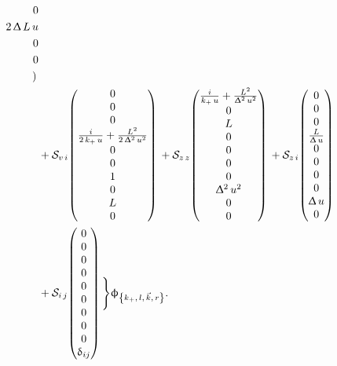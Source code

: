 \begin{equation}
\begin{split}
        0
        \\
        2\, \Delta\, L\, u
        \\
        0
        \\
        0
        \\
      )\,
      \\
      & +
      \cS_{v\, i}
      \mqty(
        0
        \\
        0
        \\
        0
        \\
        \frac{i}{2\, k_+\, u}
        +
        \frac{L^2}{2\, \Delta^2\, u^2}
        \\
        0
        \\
        0
        \\
        1
        \\
        0
        \\
        L
        \\
        0
        \\
      )\,
      +
      \cS_{z\, z}
      \mqty(
        \frac{i}{k_+\, u}
        +
        \frac{L^2}{\Delta^2\, u^2}
        \\
        0
        \\
        L
        \\
        0
        \\
        0
        \\
        0
        \\
        0
        \\
        \Delta^2\, u^2
        \\
        0
        \\
        0
        \\
      )\,
      +
      \cS_{z\, i}
      \mqty(
        0
        \\
        0
        \\
        0
        \\
        \frac{L}{\Delta\, u}
        \\
        0
        \\
        0
        \\
        0
        \\
        0
        \\
        \Delta\, u
        \\
        0
        \\
      )\,
      \\
      & +
      \cS_{i\, j}
      \mqty(
        0
        \\
        0
        \\
        0
        \\
        0
        \\
        0
        \\
        0
        \\
        0
        \\
        0
        \\
        0
        \\
        \delta_{i j}
        \\
      )\,
    \Biggr\rbrace
    \phi_{\kmkr}.
  \end{split}
\end{equation}
